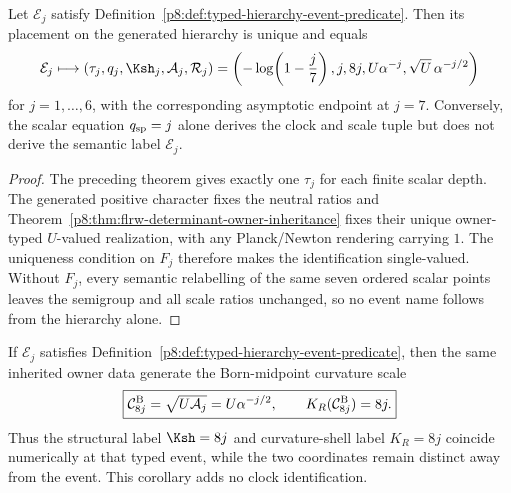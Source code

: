 \documentclass[12pt,a4paper]{article}
\begin{document}
\begin{theorem}
\label{p8:thm:typed-hierarchy-event-identification}
Let \(\mathcal E_j\) satisfy
Definition~\ref{p8:def:typed-hierarchy-event-predicate}.  Then its placement on
the generated hierarchy is unique and equals
\begin{equation}
 \mathcal E_j\longmapsto
 \left(\tau_j,q_j,{\Ksh}_j,\mathcal A_j,\mathcal R_j\right)
 =\left(
 -\log\!\left(1-\frac j7\right),
 j,8j,U\alpha^{-j},
 \sqrt U\,\alpha^{-j/2}
 \right)
\end{equation}
for \(j=1,\ldots,6\), with the corresponding asymptotic endpoint at \(j=7\).
Conversely, the scalar equation \(q_{\rm sp}=j\) alone derives the clock and
scale tuple but does not derive the semantic label \(\mathcal E_j\).
\end{theorem}

\begin{proof}
The preceding theorem gives exactly one \(\tau_j\) for each finite scalar
depth.  The generated positive character fixes the neutral ratios and
Theorem~\ref{p8:thm:flrw-determinant-owner-inheritance} fixes their unique
owner-typed \(U\)-valued realization, with any Planck/Newton rendering carrying \(1\).
The uniqueness condition on \(F_j\) therefore makes the identification
single-valued.  Without \(F_j\), every semantic relabelling of the same seven
ordered scalar points leaves the semigroup and all scale ratios unchanged, so
no event name follows from the hierarchy alone.
\end{proof}

\begin{corollary}
\label{p8:cor:typed-event-born-midpoint-curvature}
If \(\mathcal E_j\) satisfies
Definition~\ref{p8:def:typed-hierarchy-event-predicate}, then the same inherited
owner data generate the Born-midpoint curvature scale
\[
 \boxed{\mathcal C^{\rm B}_{8j}=\sqrt{U\mathcal A_j}
 =U\alpha^{-j/2},\qquad K_R(\mathcal C^{\rm B}_{8j})=8j.}
\]
Thus the structural label \(\Ksh=8j\) and curvature-shell label \(K_R=8j\)
coincide numerically at that typed event, while the two coordinates remain
distinct away from the event.  This corollary adds no clock identification.
\end{corollary}
\end{document}
